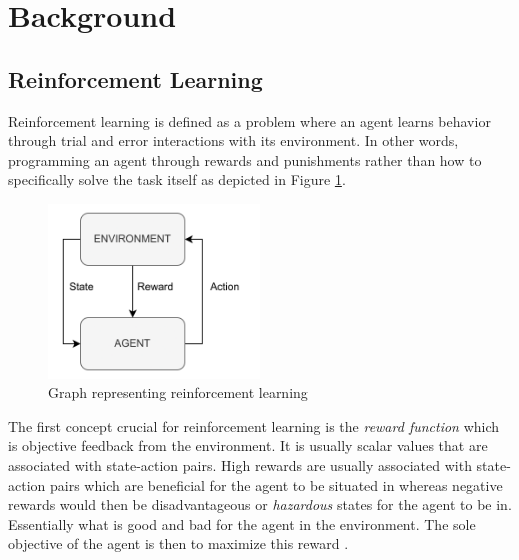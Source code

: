 \section{Background}

\subsection{Reinforcement Learning}

Reinforcement learning is defined as a problem where an agent learns behavior through trial and error interactions with its environment. 
In other words, programming an agent through rewards and punishments rather than how to specifically solve the task itself \cite{kaelbling1996reinforcement} as depicted in Figure \ref{figRL}.
\begin{figure}[H]
    \centering
    \includegraphics [width=0.5\textwidth]{Images/RL_graph.png}
    \caption{Graph representing reinforcement learning}
    \label{figRL}
\end{figure}
The first concept crucial for reinforcement learning is the \textit{reward function} which is objective feedback from the environment. 
It is usually scalar values that are associated with state-action pairs. 
High rewards are usually associated with state-action pairs which are beneficial for the agent to be situated in whereas negative rewards would then be disadvantageous or \textit{hazardous} states for the agent to be in. 
Essentially what is good and bad for the agent in the environment. The sole objective of the agent is then to maximize this reward \cite{sutton1999reinforcement}.

